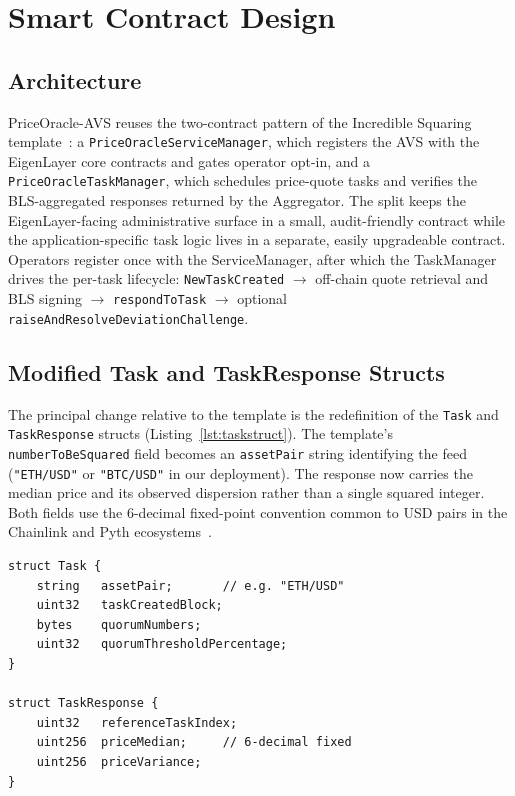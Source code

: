 \section{Smart Contract Design}
\label{sec:contracts}

\subsection{Architecture}

PriceOracle-AVS reuses the two-contract pattern of the Incredible
Squaring template~\cite{layrlabs_isavs}: a
\texttt{PriceOracleServiceManager}, which registers the AVS with the
EigenLayer core contracts and gates operator opt-in, and a
\texttt{PriceOracleTaskManager}, which schedules price-quote tasks
and verifies the BLS-aggregated responses returned by the
Aggregator.  The split keeps the EigenLayer-facing administrative
surface in a small, audit-friendly contract while the
application-specific task logic lives in a separate, easily upgradeable
contract.  Operators register once with the ServiceManager, after
which the TaskManager drives the per-task lifecycle:
\texttt{NewTaskCreated} $\rightarrow$ off-chain quote retrieval and
BLS signing $\rightarrow$ \texttt{respondToTask} $\rightarrow$
optional \texttt{raiseAndResolveDeviationChallenge}.

\subsection{Modified Task and TaskResponse Structs}

The principal change relative to the template is the redefinition of
the \texttt{Task} and \texttt{TaskResponse} structs (Listing~\ref{lst:taskstruct}).
The template's \texttt{numberToBeSquared} field becomes an
\texttt{assetPair} string identifying the feed (\texttt{"ETH/USD"} or
\texttt{"BTC/USD"} in our deployment).  The response now carries the
median price and its observed dispersion rather than a single
squared integer.  Both fields use the 6-decimal fixed-point
convention common to USD pairs in the Chainlink and Pyth
ecosystems~\cite{breidenbach2021chainlink, pyth2023}.

\begin{lstlisting}[language=Solidity, caption={Task and TaskResponse structs.}, label={lst:taskstruct}]
struct Task {
    string   assetPair;       // e.g. "ETH/USD"
    uint32   taskCreatedBlock;
    bytes    quorumNumbers;
    uint32   quorumThresholdPercentage;
}

struct TaskResponse {
    uint32   referenceTaskIndex;
    uint256  priceMedian;     // 6-decimal fixed
    uint256  priceVariance;
}
\end{lstlisting}

